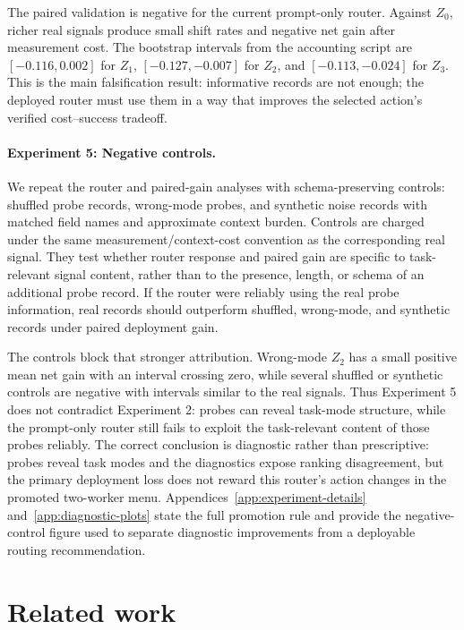 \documentclass{article}
\begin{document}
The paired validation is negative for the current prompt-only router.
Against \(Z_0\), richer real signals produce small shift rates and negative net gain after measurement cost.
The bootstrap intervals from the accounting script are \([-0.116,0.002]\) for \(Z_1\), \([-0.127,-0.007]\) for \(Z_2\), and \([-0.113,-0.024]\) for \(Z_3\).
This is the main falsification result: informative records are not enough; the deployed router must use them in a way that improves the selected action's verified cost--success tradeoff.

\paragraph{Experiment 5: Negative controls.}
We repeat the router and paired-gain analyses with schema-preserving controls: shuffled probe records, wrong-mode probes, and synthetic noise records with matched field names and approximate context burden.
Controls are charged under the same measurement/context-cost convention as the corresponding real signal.
They test whether router response and paired gain are specific to task-relevant signal content, rather than to the presence, length, or schema of an additional probe record.
If the router were reliably using the real probe information, real records should outperform shuffled, wrong-mode, and synthetic records under paired deployment gain.

The controls block that stronger attribution.
Wrong-mode \(Z_2\) has a small positive mean net gain with an interval crossing zero, while several shuffled or synthetic controls are negative with intervals similar to the real signals.
Thus Experiment 5 does not contradict Experiment 2: probes can reveal task-mode structure, while the prompt-only router still fails to exploit the task-relevant content of those probes reliably.
The correct conclusion is diagnostic rather than prescriptive: probes reveal task modes and the diagnostics expose ranking disagreement, but the primary deployment loss does not reward this router's action changes in the promoted two-worker menu.
Appendices~\ref{app:experiment-details} and~\ref{app:diagnostic-plots} state the full promotion rule and provide the negative-control figure used to separate diagnostic improvements from a deployable routing recommendation.

\section{Related work}
\label{sec:related}
\end{document}
